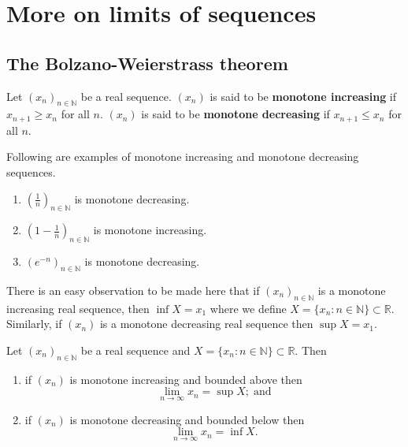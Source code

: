 \chapter{More on limits of sequences}

\section{The Bolzano-Weierstrass theorem}

\begin{definition}
    Let $(x_n)_{n\in\mathbb N}$ be a real sequence. $(x_n)$ is said to be \textbf{monotone increasing} if $x_{n+1}\geq x_n$ for all $n$. $(x_n)$ is said to be \textbf{monotone decreasing} if $x_{n+1}\leq x_n$ for all $n$.
\end{definition}

\begin{example}
    Following are examples of monotone increasing and monotone decreasing sequences.
    \begin{enumerate}
        \item $(\frac1n)_{n\in\mathbb N}$ is monotone decreasing.
        \item $(1-\frac1n)_{n\in\mathbb N}$ is monotone increasing.
        \item $(e^{-n})_{n\in\mathbb N}$ is monotone decreasing.
    \end{enumerate}
\end{example}

\begin{remark}
    There is an easy observation to be made here that if  $(x_n)_{n\in\mathbb N}$ is a monotone increasing real sequence, then $\inf{X}=x_1$ where we define $X=\{x_n:n\in\mathbb N\}\subset\mathbb R$. Similarly, if $(x_n)$ is a monotone decreasing real sequence then $\sup{X}=x_1$.
\end{remark}

\begin{theorem}\label{thm:bounded_monotone}
    Let $(x_n)_{n\in\mathbb N}$ be a real sequence and $X=\{x_n:n\in\mathbb N\}\subset\mathbb R$. Then
    \begin{enumerate}
        \item if $(x_n)$ is monotone increasing and bounded above then \[\lim_{n\to\infty}x_n=\sup{X};\;\text{and}\]
        \item if $(x_n)$ is monotone decreasing and bounded below then \[\lim_{n\to\infty}x_n=\inf{X}.\]
    \end{enumerate}
\end{theorem}

